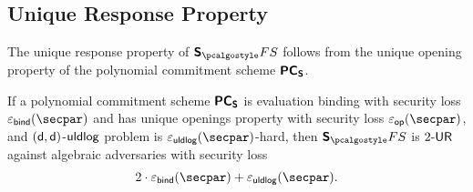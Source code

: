 \subsection{Unique Response Property}
The unique response property of $\sonicprotfs$ follows from the unique opening
property of the polynomial commitment scheme $\bm{\mathsf{PC}}_{\bm{\mathsf{S}}}$.
\begin{lemma}
\label{lem:sonicprot_ur}
If a polynomial commitment scheme $\bm{\mathsf{PC}}_{\bm{\mathsf{S}}}$ is evaluation binding with security loss $\epsbind (\secpar)$ and has unique openings property with security loss $\epsop(\secpar)$, and $(\mathsf{d}, \mathsf{d})$-$\mathsf{uldlog}$ problem is $\epsuldlog (\secpar)$-hard, then $\sonicprotfs$ is ${2\text{-}\mathsf{UR}}$ against algebraic adversaries with security loss
  \[
    2 \cdot \epsbinding (\secpar) + \epsuldlog (\secpar).
  \]
\end{lemma}

